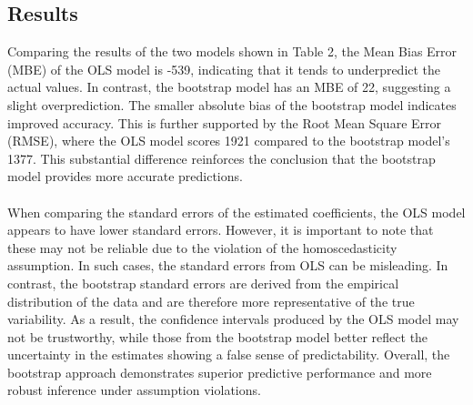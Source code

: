 \subsection{Results}
Comparing the results of the two models shown in Table 2, the Mean Bias Error (MBE) of the OLS model is -539, indicating that it tends to underpredict the actual values. In contrast, the bootstrap model has an MBE of 22, suggesting a slight overprediction. The smaller absolute bias of the bootstrap model indicates improved accuracy. This is further supported by the Root Mean Square Error (RMSE), where the OLS model scores 1921 compared to the bootstrap model’s 1377. This substantial difference reinforces the conclusion that the bootstrap model provides more accurate predictions.
\\\\
When comparing the standard errors of the estimated coefficients, the OLS model appears to have lower standard errors. However, it is important to note that these may not be reliable due to the violation of the homoscedasticity assumption. In such cases, the standard errors from OLS can be misleading. In contrast, the bootstrap standard errors are derived from the empirical distribution of the data and are therefore more representative of the true variability. As a result, the confidence intervals produced by the OLS model may not be trustworthy, while those from the bootstrap model better reflect the uncertainty in the estimates showing a false sense of predictability. Overall, the bootstrap approach demonstrates superior predictive performance and more robust inference under assumption violations.
\\



